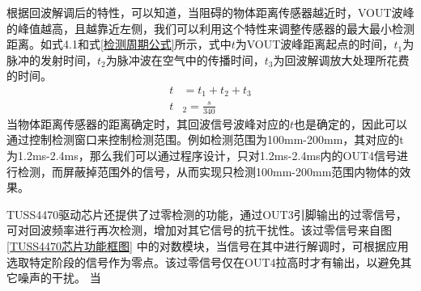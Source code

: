     根据回波解调后的特性，可以知道，当阻碍的物体距离传感器越近时，VOUT波峰的峰值越高，且越靠近左侧，我们可以利用这个特性来调整传感器的最大最小检测距离。如式4.1和式\ref{检测周期公式}所示，式中$t$为VOUT波峰距离起点的时间，$t_1$为脉冲的发射时间，$t_2$为脉冲波在空气中的传播时间，$t_3$为回波解调放大处理所花费的时间。
        \begin{align}
            t&=t_1+t_2+t_3 \\
            t&_2=\frac{s}{340}
        \label{检测周期公式}
        \end{align}             
    当物体距离传感器的距离确定时，其回波信号波峰对应的$t$也是确定的，因此可以通过控制检测窗口来控制检测范围。例如检测范围为100mm-200mm，其对应的t为1.2ms-2.4ms，那么我们可以通过程序设计，只对1.2ms-2.4ms内的OUT4信号进行检测，而屏蔽掉范围外的信号，从而实现只检测100mm-200mm范围内物体的效果。\par
    TUSS4470驱动芯片还提供了过零检测的功能，通过OUT3引脚输出的过零信号，可对回波频率进行再次检测，增加对其它信号的抗干扰性。该过零信号来自图\ref{TUSS4470芯片功能框图}
    中的对数模块，当信号在其中进行解调时，可根据应用选取特定阶段的信号作为零点。该过零信号仅在OUT4拉高时才有输出，以避免其它噪声的干扰。
    当
